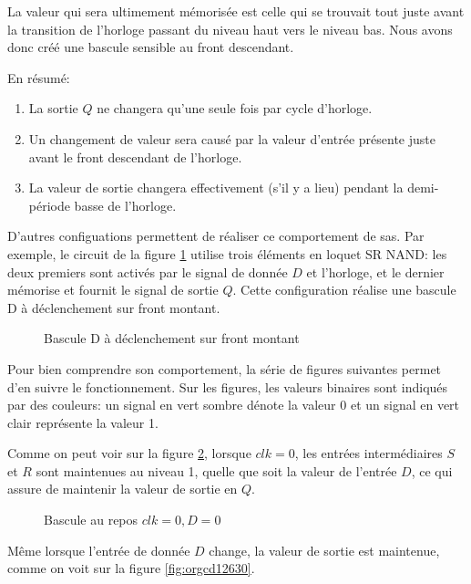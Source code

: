 \documentclass[11pt]{article}
\begin{document}
La valeur qui sera ultimement mémorisée est celle qui se trouvait tout
juste avant la transition de l'horloge passant du niveau haut vers le
niveau bas. Nous avons donc créé une bascule sensible au front
descendant.

En résumé:
\begin{enumerate}
\item La sortie \(Q\) ne changera qu'une seule fois par cycle d'horloge.
\item Un changement de valeur sera causé par la valeur d'entrée présente
juste avant le front descendant de l'horloge.
\item La valeur de sortie changera effectivement (s'il y a lieu) pendant
la demi-période basse de l'horloge.
\end{enumerate}

D'autres configuations permettent de réaliser ce comportement de
sas. Par exemple, le circuit de la figure \ref{fig:orgfcad924} utilise
trois éléments en loquet SR NAND: les deux premiers sont activés par
le signal de donnée \(D\) et l'horloge, et le dernier mémorise et
fournit le signal de sortie \(Q\). Cette configuration réalise une
bascule D à déclenchement sur front montant.

\begin{figure}[htbp]
\centering

\caption{\label{fig:orgfcad924}Bascule D à déclenchement sur front montant}
\end{figure}

Pour bien comprendre son comportement, la série de figures suivantes
permet d'en suivre le fonctionnement. Sur les figures, les valeurs
binaires sont indiqués par des couleurs: un signal en vert sombre
dénote la valeur 0 et un signal en vert clair représente la valeur 1.

Comme on peut voir sur la figure \ref{fig:orgdcc1920}, lorsque \(clk = 0\), les
entrées intermédiaires \(S\) et \(R\) sont maintenues au niveau 1,
quelle que soit la valeur de l'entrée \(D\), ce qui assure de
maintenir la valeur de sortie en \(Q\).

\begin{figure}[htbp]
\centering

\caption{\label{fig:orgdcc1920}Bascule au repos  \(clk = 0, D=0\)}
\end{figure}

Même lorsque l'entrée de donnée \(D\) change, la valeur de sortie est
maintenue, comme on voit sur la figure \ref{fig:orgcd12630}.
\end{document}
